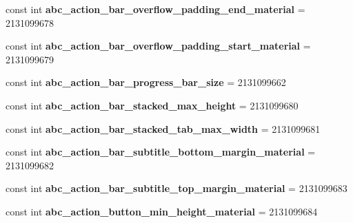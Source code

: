 \begin{DoxyCompactItemize}
const int {\bfseries abc\+\_\+action\+\_\+bar\+\_\+overflow\+\_\+padding\+\_\+end\+\_\+material} = 2131099678
\item 
\mbox{\label{class_pinned_app_1_1_droid_1_1_resource_1_1_dimension_a82b775dd7926fd9022193b353fb7f07e}} 
const int {\bfseries abc\+\_\+action\+\_\+bar\+\_\+overflow\+\_\+padding\+\_\+start\+\_\+material} = 2131099679
\item 
\mbox{\label{class_pinned_app_1_1_droid_1_1_resource_1_1_dimension_a9512339b9b4ec43bf972fe9872599fc9}} 
const int {\bfseries abc\+\_\+action\+\_\+bar\+\_\+progress\+\_\+bar\+\_\+size} = 2131099662
\item 
\mbox{\label{class_pinned_app_1_1_droid_1_1_resource_1_1_dimension_ae1049a6b95f947569fdb7033e58f2f1e}} 
const int {\bfseries abc\+\_\+action\+\_\+bar\+\_\+stacked\+\_\+max\+\_\+height} = 2131099680
\item 
\mbox{\label{class_pinned_app_1_1_droid_1_1_resource_1_1_dimension_ae14d23aaa2efd9111a9360278d465a14}} 
const int {\bfseries abc\+\_\+action\+\_\+bar\+\_\+stacked\+\_\+tab\+\_\+max\+\_\+width} = 2131099681
\item 
\mbox{\label{class_pinned_app_1_1_droid_1_1_resource_1_1_dimension_a879f6778f3a944fc3fdf9155e62096ed}} 
const int {\bfseries abc\+\_\+action\+\_\+bar\+\_\+subtitle\+\_\+bottom\+\_\+margin\+\_\+material} = 2131099682
\item 
\mbox{\label{class_pinned_app_1_1_droid_1_1_resource_1_1_dimension_a201fffa957a9dab469a2256b5649101e}} 
const int {\bfseries abc\+\_\+action\+\_\+bar\+\_\+subtitle\+\_\+top\+\_\+margin\+\_\+material} = 2131099683
\item 
\mbox{\label{class_pinned_app_1_1_droid_1_1_resource_1_1_dimension_af0daeaf0d354d5fe7f53ea2e7e5ce3af}} 
const int {\bfseries abc\+\_\+action\+\_\+button\+\_\+min\+\_\+height\+\_\+material} = 2131099684
\item 

\end{DoxyCompactItemize}

